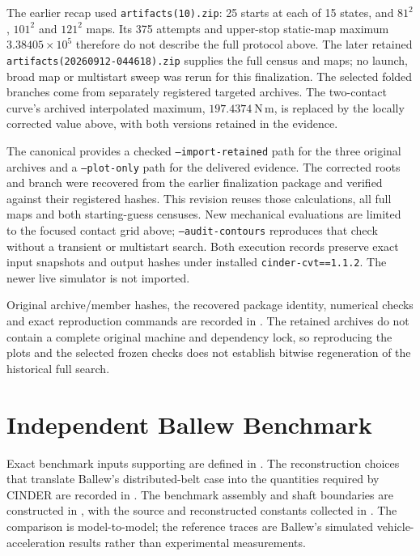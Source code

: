 \documentclass[11pt]{report}
\numberwithin{equation}{section}
\begin{document}
The earlier recap used \texttt{artifacts(10).zip}: 25 starts at each of
15 states, and \(81^2\), \(101^2\) and \(121^2\) maps. Its 375 attempts
and upper-stop static-map maximum \(3.38405\times10^5\) therefore do not
describe the full protocol above. The later retained
\texttt{artifacts(20260912-044618).zip} supplies the full census and maps;
no launch, broad map or multistart sweep was rerun for this finalization.
The selected folded branches come from separately registered targeted
archives. The two-contact curve's archived interpolated maximum,
\(197.4374~\mathrm{N\,m}\), is replaced by the locally corrected value
above, with both versions retained in the evidence.

The canonical
provides a checked \texttt{--import-retained} path for the three original
archives and a \texttt{--plot-only} path for the delivered evidence.
The corrected roots and branch were recovered from the earlier finalization
package and verified against their registered hashes. This revision reuses
those calculations, all full maps and both starting-guess censuses. New
mechanical evaluations are limited to the focused contact grid above;
\texttt{--audit-contours} reproduces that check without a transient or
multistart search. Both execution records preserve exact input snapshots
and output hashes under installed \texttt{cinder-cvt==1.1.2}.
The newer live simulator is not imported.

Original archive/member hashes, the recovered package identity, numerical
checks and exact reproduction commands are recorded in
.
The retained archives do not contain a complete original machine and
dependency lock, so reproducing the plots and the selected frozen checks
does not establish bitwise regeneration of the historical full search.
\FloatBarrier

\section{Independent Ballew Benchmark}
\label{app:study_ballew}

Exact benchmark inputs supporting  are
defined in
. The reconstruction
choices that translate Ballew's distributed-belt case into the quantities
required by CINDER are recorded in
.
The benchmark assembly and shaft boundaries are constructed in
,
with the source and reconstructed constants collected in
.
The comparison is model-to-model; the reference traces are Ballew's simulated
vehicle-acceleration results rather than experimental measurements.
\end{document}
